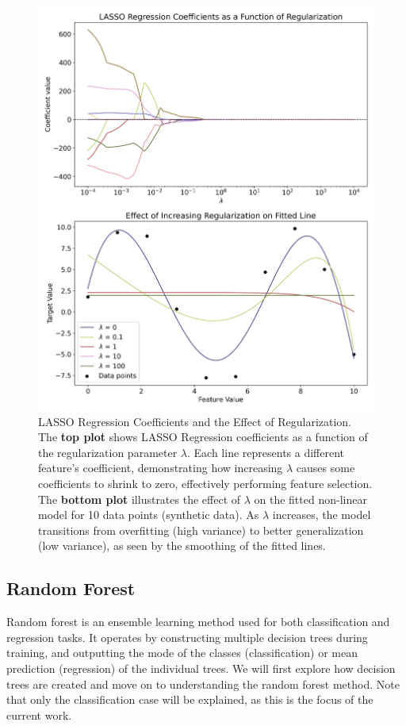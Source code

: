 \documentclass[english,11pt,a4paper,titlepage]{article}
\begin{document}
	\begin{figure}[!t]
		\centering
		\includegraphics[width=1.0\linewidth]{img/lasso_lambda_effect}
		\caption{LASSO Regression Coefficients and the Effect of Regularization. \\ The \textbf{top plot} shows LASSO Regression coefficients as a function of the regularization parameter $\lambda$. Each line represents a different feature's coefficient, demonstrating how increasing $\lambda$ causes some coefficients to shrink to zero, effectively performing feature selection. The \textbf{bottom plot} illustrates the effect of $\lambda$ on the fitted non-linear model for 10 data points (synthetic data). As $\lambda$ increases, the model transitions from overfitting (high variance) to better generalization (low variance), as seen by the smoothing of the fitted lines.}
		\label{fig:lassolambdaeffect}
	\end{figure}
	\clearpage
	
	\subsection*{Random Forest}
	Random forest is an ensemble learning method used for both classification and regression tasks. It operates by constructing multiple decision trees during training, and outputting the mode of the classes (classification) or mean prediction (regression) of the individual trees. We will first explore how decision trees are created and move on to understanding the random forest method. Note that only the classification case will be explained, as this is the focus of the current work.
	
\end{document}

